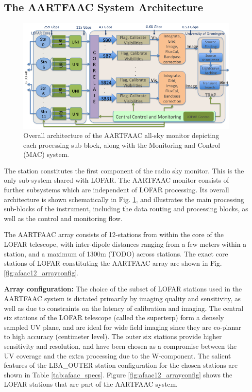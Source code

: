\documentclass{ws-jai}
\begin{document}
\subsection {\label{subsec:aartfaac}  The AARTFAAC System Architecture}
\begin{figure}[htbp]
\centering
\includegraphics[width=1\textwidth]{Figs/Overall_arch_afaac/Slide1.png}
\caption {Overall  architecture of the  AARTFAAC all-sky monitor  depicting each
  processing sub block, along with the Monitoring and Control (MAC) system. }
\label{fig:afaac_arch}
\end{figure}

The station  constitutes the first component  of the radio sky  monitor. This is
the only sub-system shared with LOFAR.  The AARTFAAC monitor consists of further
subsystems which are independent of  LOFAR processing.  Its overall architecture
is shown schematically in Fig. \ref{fig:afaac_arch}, and illustrates the main
processing  sub-blocks  of  the  instrument,  including  the  data  routing  and
processing blocks, as well as the control and monitoring flow.

The AARTFAAC  array consists of  12-stations from within  the core of  the LOFAR
telescope,  with inter-dipole  distances  ranging  from a  few  meters within  a
station, and a maximum of 1300m  (TODO) across stations. The exact core stations
of    LOFAR     constituting    the     AARTFAAC    array    are     shown    in
Fig. \ref{fig:afaac12_arrayconfig}.

\noindent  \textbf {Array  configuration:} The  choice  of the  subset of  LOFAR
stations used  in the AARTFAAC system  is dictated primarily by  imaging quality
and sensitivity, as well as due to constraints on the latency of calibration and
imaging. The central six stations of  the LOFAR telescope (called the superterp)
form a densely sampled UV plane, and are ideal for wide field imaging since they
are  co-planar to  high accuracy  (centimeter  level).  The  outer six  stations
provide higher sensitivity and resolution, and  have been chosen as a compromise
between the  UV coverage and the  extra processing due to  the W-component.  The
salient features of the LBA\_OUTER station configuration for the chosen stations
are     shown     in           Table     \ref{tab:afaac_specs}.      Figure
\ref{fig:afaac12_arrayconfig}  shows the  LOFAR stations  that are  part of  the
AARTFAAC system.
\end{document}
